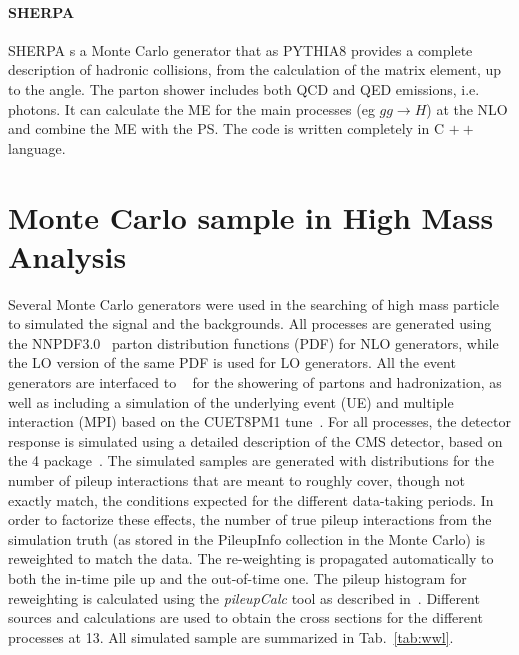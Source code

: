  
\paragraph{S{\footnotesize HERPA}}  S{\footnotesize HERPA}  \cite{bib:sherpa} s a Monte Carlo generator that as PYTHIA8 provides a complete description of hadronic collisions, from the calculation of the matrix element, up to the angle. The parton shower includes both QCD and QED emissions, i.e. photons. It can calculate the ME for the main processes (eg $ gg \rightarrow H $) at the NLO and combine the ME with the PS. The code is written completely in C $ ++ $ language.




\section{Monte Carlo sample in High Mass Analysis}

Several  Monte Carlo  generators were used in the searching of high mass particle to simulated the signal and the backgrounds. 
All processes are generated using the NNPDF3.0~\cite{Ball:2013hta,Ball:2011uy} parton distribution functions (PDF) for NLO generators,
while the LO version of the same PDF is used for LO generators. All the event generators are interfaced 
to ~\cite{Sjostrand:2007gs} for the showering of
partons and hadronization, as well as including a simulation of the underlying event (UE) and multiple interaction (MPI)
based on the CUET8PM1 tune~\cite{Khachatryan:2015pea}. 
For all processes, the detector response is simulated using a detailed
description of the CMS detector, based on the \GEANT{}4 package~\cite{Agostinelli:2002hh}. 
The simulated samples are generated with distributions for the number of pileup interactions that are meant to roughly cover,
though not exactly match, the conditions expected for the different data-taking periods. In order to factorize these effects, 
the number of true pileup interactions from the simulation truth (as stored in the PileupInfo collection in the Monte Carlo)
is reweighted to match the data.
The re-weighting is propagated automatically to both the in-time pile up and the out-of-time one.
The pileup histogram for reweighting is calculated using the \emph{pileupCalc} tool as described in~\cite{puJSON}. 
Different sources and calculations are used to obtain the cross sections for the different processes at 13\TeV. 
All simulated sample are summarized in Tab.~\ref{tab:wwl}.



